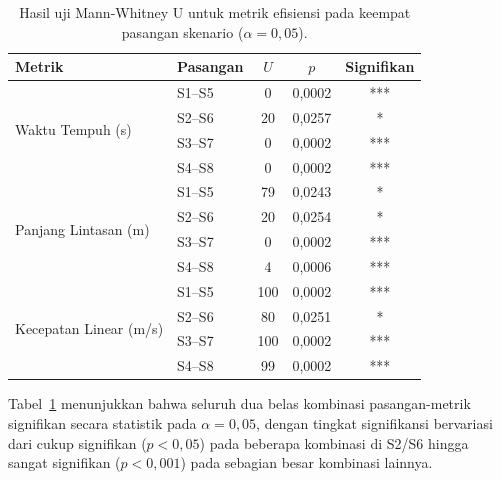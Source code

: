 \begin{table}[H]
\centering
\caption{Hasil uji Mann-Whitney U untuk metrik efisiensi pada keempat
pasangan skenario ($\alpha=0,05$).}
\label{tab:tradeoff_mwu}
\begin{tabular}{llccc}
\toprule
\textbf{Metrik} & \textbf{Pasangan} & \textbf{$U$} & \textbf{$p$} & \textbf{Signifikan} \\
\midrule
\multirow{4}{*}{Waktu Tempuh (s)}
 & S1--S5 & 0  & 0,0002 & *** \\
 & S2--S6 & 20 & 0,0257 & *  \\
 & S3--S7 & 0  & 0,0002 & *** \\
 & S4--S8 & 0  & 0,0002 & *** \\
\midrule
\multirow{4}{*}{Panjang Lintasan (m)}
 & S1--S5 & 79 & 0,0243 & *  \\
 & S2--S6 & 20 & 0,0254 & *  \\
 & S3--S7 & 0  & 0,0002 & *** \\
 & S4--S8 & 4  & 0,0006 & *** \\
\midrule
\multirow{4}{*}{Kecepatan Linear (m/s)}
 & S1--S5 & 100 & 0,0002 & *** \\
 & S2--S6 & 80  & 0,0251 & *  \\
 & S3--S7 & 100 & 0,0002 & *** \\
 & S4--S8 & 99  & 0,0002 & *** \\
\bottomrule
\end{tabular}
\end{table}

Tabel~\ref{tab:tradeoff_mwu} menunjukkan bahwa seluruh dua belas kombinasi
pasangan-metrik signifikan secara statistik pada $\alpha=0,05$, dengan
tingkat signifikansi bervariasi dari cukup signifikan ($p<0,05$) pada
beberapa kombinasi di S2/S6 hingga sangat signifikan ($p<0,001$) pada
sebagian besar kombinasi lainnya.

